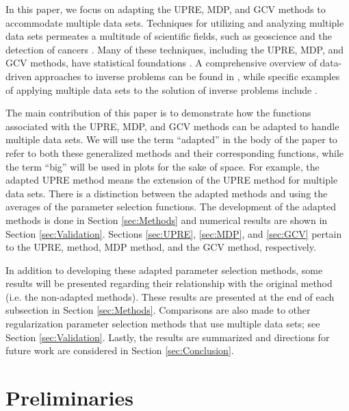 \documentclass[12pt]{article}
\begin{document}
In this paper, we focus on adapting the UPRE, MDP, and GCV methods to accommodate multiple data sets. Techniques for utilizing and analyzing multiple data sets permeates a multitude of scientific fields, such as geoscience \cite{GeoscienceML,Zobitz2020EfficientHD} and the detection of cancers \cite{MedicineML}. Many of these techniques, including the UPRE, MDP, and GCV methods, have statistical foundations \cite{StatLearning}. A comprehensive overview of data-driven approaches to inverse problems can be found in \cite{Arridge2019SolvingIP}, while specific examples of applying multiple data sets to the solution of inverse problems include \cite{ChungChungOLeary2011,ChungEspanol2017,HaberTenorio2003,KunischPock2013,TaroudakiOLeary2015,Learning2005}. \par 
The main contribution of this paper is to demonstrate how the functions associated with the UPRE, MDP, and GCV methods can be adapted to handle multiple data sets. We will use the term ``adapted'' in the body of the paper to refer to both these generalized methods and their corresponding functions, while the term ``big'' will be used in plots for the sake of space. For example, the adapted UPRE method means the extension of the UPRE method for multiple data sets. There is a distinction between the adapted methods and using the averages of the parameter selection functions. The development of the adapted methods is done in Section \ref{sec:Methods} and numerical results are shown in Section \ref{sec:Validation}. Sections \ref{sec:UPRE}, \ref{sec:MDP}, and \ref{sec:GCV} pertain to the UPRE, method, MDP method, and the GCV method, respectively.  \par 
In addition to developing these adapted parameter selection methods, some results will be presented regarding their relationship with the original method (i.e. the non-adapted methods). These results are presented at the end of each subsection in Section \ref{sec:Methods}. Comparisons are also made to other regularization parameter selection methods that use multiple data sets; see Section \ref{sec:Validation}. Lastly, the results are summarized and directions for future work are considered in Section \ref{sec:Conclusion}.

\section{Preliminaries} \label{sec:Preliminaries}
\end{document}
